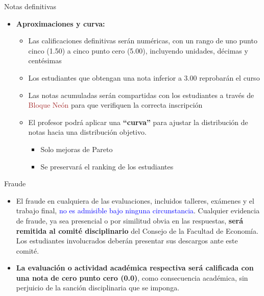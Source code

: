 \documentclass[10pt, xcolor=dvipsnames]{beamer}
\begin{document}
\begin{frame}{Notas definitivas}
\begin{itemize}
    \item \textbf{Aproximaciones y curva:}
    \begin{itemize}
        \item Las calificaciones definitivas serán numéricas, con un rango de uno punto cinco (1.50) a cinco punto cero (5.00), incluyendo unidades, décimas y centésimas
        \item Los estudiantes que obtengan una nota inferior a 3.00 reprobarán el curso
        \item Las notas acumuladas serán compartidas con los estudiantes a través de \textcolor{brown}{Bloque Neón} para que verifiquen la correcta inscripción
        \item El profesor podrá aplicar una \textbf{``curva''} para ajustar la distribución de notas hacia una distribución objetivo.
        \begin{itemize}
            \item[i.] Solo mejoras de Pareto
            \item[ii.] Se preservará el ranking de los estudiantes
        \end{itemize}
    \end{itemize}        
\end{itemize}
\end{frame}

\begin{frame}{Fraude}
    \begin{itemize}
        \item El fraude en cualquiera de las evaluaciones, incluidos talleres, exámenes y el trabajo final, \textcolor{blue}{no es admisible bajo ninguna circunstancia}. Cualquier evidencia de fraude, ya sea presencial o por similitud obvia en las respuestas, \textbf{será remitida al comité disciplinario} del Consejo de la Facultad de Economía. Los estudiantes involucrados deberán presentar sus descargos ante este comité.
        \item \textbf{La evaluación o actividad académica respectiva será calificada con una nota de cero punto cero (0.0)}, como consecuencia académica, sin perjuicio de la sanción disciplinaria que se imponga.
    \end{itemize}    
\end{frame}

\end{document}
